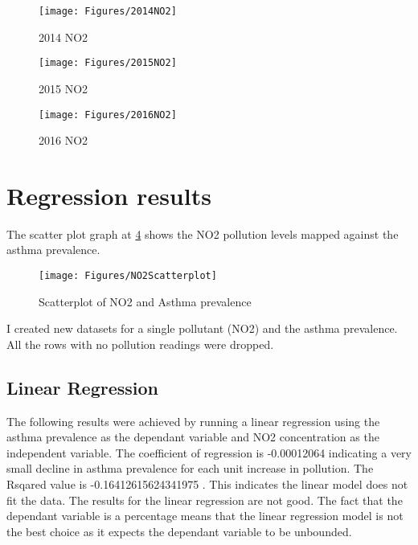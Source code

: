 \begin{figure}[]
	\centering
	\hspace*{-2cm}\texttt{[image: Figures/2014NO2]}
	
	\caption[2014NO2]{2014 NO2}
	\label{fig:2014NO2}
\end{figure}
\begin{figure}[]
	\centering
	\hspace*{-2cm}\texttt{[image: Figures/2015NO2]}
	
	\caption[2015NO2]{2015 NO2}
	\label{fig:2015NO2}
\end{figure}
\begin{figure}[]
	\centering
	\hspace*{-2cm}\texttt{[image: Figures/2016NO2]}
	
	\caption[2016NO2]{2016 NO2}
	\label{fig:2016NO2}
\end{figure}
\section{Regression results}
The scatter plot graph at \ref{fig:Scatterplot} shows the NO2 pollution levels mapped against the asthma prevalence.


\begin{figure}
	\centering
	\texttt{[image: Figures/NO2Scatterplot]}
	\decoRule
	\caption[Scatterplot]{Scatterplot of NO2 and Asthma prevalence}
	\label{fig:Scatterplot}
\end{figure}
I created new datasets for a single pollutant (NO2) and the asthma prevalence. All the rows with no pollution readings were dropped.

\subsection{Linear Regression}

The following results were achieved by running a linear regression using the asthma prevalence as the dependant variable and NO2 concentration as the independent variable.
The coefficient of regression is -0.00012064 indicating a very small decline in asthma prevalence for each unit increase in pollution. The Rsqared value is -0.16412615624341975 . This indicates the linear model does not fit the data. The results for the linear regression are not good. The fact that the dependant variable is a percentage means that the linear regression model is not the best choice as it expects the dependant variable to be unbounded.

